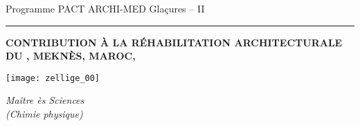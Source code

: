 {  \begin{center}
    \vfill
    \vspace{5\baselineskip}

    {\LARGE
      Programme PACT ARCHI-MED Glaçures -- II\par
    }

    \rule{.5\textwidth}{1pt}

    {\bfseries\huge
      \MakeUppercase{Contribution à la réhabilitation architecturale 
      du \PaM, Meknès, Maroc, }

      \bigskip

      \@title\par
    }

    \vfill

    \texttt{[image: zellige\_00]}

    \vfill

    \textbf{\Large\@author}\par

    \emph{Maître ès Sciences\\(Chimie physique)}\par
  \end{center}
  \newpage
}
\makeatother
